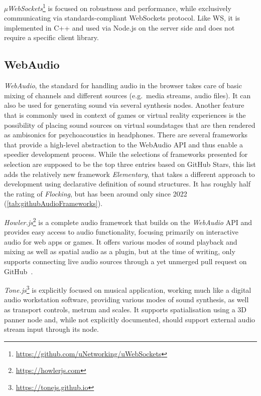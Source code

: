 \emph{µWebSockets}\footnote{\url{https://github.com/uNetworking/uWebSockets}} is focused on robustness and performance, while exclusively communicating via standards-compliant WebSockets protocol.
Like WS, it is implemented in C++ and used via Node.js on the server side and does not require a specific client library.

\subsection{WebAudio}

\emph{WebAudio}, the standard for handling audio in the browser takes care of basic mixing of channels and different sources (e.g.\ media streams, audio files).
It can also be used for generating sound via several synthesis nodes.
Another feature that is commonly used in context of games or virtual reality experiences is the possibility of placing sound sources on virtual soundstages that are then rendered as ambisonics for psychoacoustics in headphones.
There are several frameworks that provide a high-level abstraction to the WebAudio \ac{API} and thus enable a speedier development process.
While the selections of frameworks presented for selection are supposed to be the top three entries based on GitHub Stars, this list adds the relatively new framework \emph{Elementary}, that takes a different approach to development using declarative definition of sound structures.
It has roughly half the rating of \emph{Flocking}, but has been around only since 2022 (\ref{tab:githubAudioFrameworks}).



\emph{Howler.js}\footnote{\url{https://howlerjs.com}} is a complete audio framework that builds on the \emph{WebAudio} \ac{API} and provides easy access to audio functionality, focusing primarily on interactive audio for web apps or games.
It offers various modes of sound playback and mixing as well as spatial audio as a plugin, but at the time of writing, only supports connecting live audio sources through a yet unmerged pull request on GitHub~\parencite{githubHowlerPullRequest}.

\emph{Tone.js}\footnote{\url{https://tonejs.github.io}} is explicitly focused on musical application, working much like a digital audio workstation software, providing various modes of sound synthesis, as well as transport controls, metrum and scales.
It supports spatialisation using a \ac{3D} panner node and, while not explicitly documented, should support external audio stream input through its  node.

